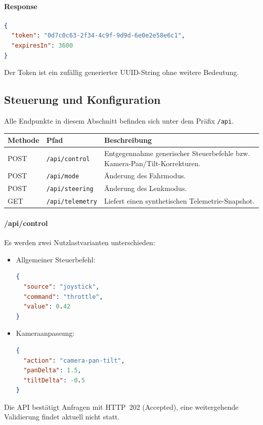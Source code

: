 \documentclass[a4paper,11pt]{article}
\begin{document}
\paragraph{Response}
\begin{lstlisting}[language=json]
{
  "token": "0d7c0c63-2f34-4c9f-9d9d-6e0e2e58e6c1",
  "expiresIn": 3600
}
\end{lstlisting}

Der Token ist ein zufällig generierter UUID-String ohne weitere Bedeutung.

\subsection{Steuerung und Konfiguration}
Alle Endpunkte in diesem Abschnitt befinden sich unter dem Präfix \texttt{/api}.
\begin{longtable}{p{3.2cm}p{3cm}p{7.5cm}}
\textbf{Methode} & \textbf{Pfad} & \textbf{Beschreibung}\\\hline
POST & \texttt{/api/control} & Entgegennahme generischer Steuerbefehle bzw. Kamera-Pan/Tilt-Korrekturen.\\
POST & \texttt{/api/mode} & Änderung des Fahrmodus.\\
POST & \texttt{/api/steering} & Änderung des Lenkmodus.\\
GET & \texttt{/api/telemetry} & Liefert einen synthetischen Telemetrie-Snapshot.\\
\end{longtable}

\paragraph{/api/control}
Es werden zwei Nutzlastvarianten unterschieden:
\begin{itemize}
  \item Allgemeiner Steuerbefehl:
\begin{lstlisting}[language=json]
{
  "source": "joystick",
  "command": "throttle",
  "value": 0.42
}
\end{lstlisting}
  \item Kameraanpassung:
\begin{lstlisting}[language=json]
{
  "action": "camera-pan-tilt",
  "panDelta": 1.5,
  "tiltDelta": -0.5
}
\end{lstlisting}
\end{itemize}
Die API bestätigt Anfragen mit HTTP~202 (Accepted), eine weitergehende Validierung findet aktuell nicht statt.
\end{document}
